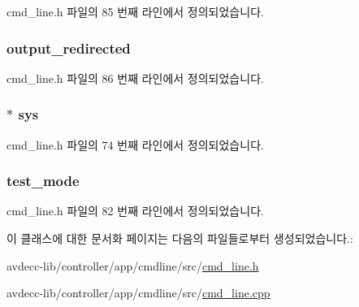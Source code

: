 cmd\+\_\+line.\+h 파일의 85 번째 라인에서 정의되었습니다.

\subsubsection[{\texorpdfstring{output\+\_\+redirected}{output_redirected}}]{ output\+\_\+redirected\hspace{0.3cm}{\ttfamily [private]}}\hypertarget{classcmd__line_a4145a9821510d9b30d980e665d9bd68e}{}\label{classcmd__line_a4145a9821510d9b30d980e665d9bd68e}


cmd\+\_\+line.\+h 파일의 86 번째 라인에서 정의되었습니다.

\subsubsection[{\texorpdfstring{sys}{sys}}]{$\ast$ sys\hspace{0.3cm}{\ttfamily [private]}}\hypertarget{classcmd__line_a485db4800e331cb4052c447fdf5d154e}{}\label{classcmd__line_a485db4800e331cb4052c447fdf5d154e}


cmd\+\_\+line.\+h 파일의 74 번째 라인에서 정의되었습니다.

\subsubsection[{\texorpdfstring{test\+\_\+mode}{test_mode}}]{ test\+\_\+mode\hspace{0.3cm}{\ttfamily [private]}}\hypertarget{classcmd__line_a07c66893ce868671f9998dad80094cb1}{}\label{classcmd__line_a07c66893ce868671f9998dad80094cb1}


cmd\+\_\+line.\+h 파일의 82 번째 라인에서 정의되었습니다.



이 클래스에 대한 문서화 페이지는 다음의 파일들로부터 생성되었습니다.\+:\begin{DoxyCompactItemize}
\item 
avdecc-\/lib/controller/app/cmdline/src/\hyperlink{cmd__line_8h}{cmd\+\_\+line.\+h}\item 
avdecc-\/lib/controller/app/cmdline/src/\hyperlink{cmd__line_8cpp}{cmd\+\_\+line.\+cpp}\end{DoxyCompactItemize}
